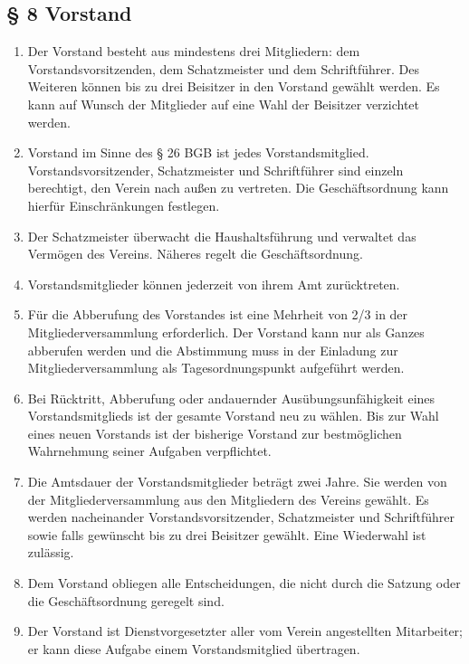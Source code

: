 ﻿\documentclass[10pt,a4paper]{scrartcl}
\begin{document}
%
%
\subsection*{§ 8 Vorstand }
\begin{enumerate}

    \item Der Vorstand besteht aus mindestens drei Mitgliedern: dem
    Vorstandsvorsitzenden, dem Schatzmeister und dem Schriftführer. Des
    Weiteren können bis zu drei Beisitzer in den Vorstand gewählt werden. Es
    kann auf Wunsch der Mitglieder auf eine Wahl der Beisitzer verzichtet
    werden.
    \item Vorstand im Sinne des § 26 BGB ist jedes Vorstandsmitglied.
    Vorstandsvorsitzender, Schatzmeister und Schriftführer sind einzeln
    berechtigt, den Verein nach außen zu vertreten. Die Geschäftsordnung kann
    hierfür Einschränkungen festlegen.
	\item Der Schatzmeister über\-wacht die Haushaltsführung und verwaltet das
		Ver\-mö\-gen des Vereins. Nä\-her\-es regelt die Ge\-schäfts\-ord\-nung.
	\item Vorstandsmitglieder können jederzeit von ihrem Amt zurücktreten.
        \item Für die Abberufung des Vorstandes ist eine Mehrheit von 2/3 in der Mitgliederversammlung erforderlich. Der Vorstand kann nur als Ganzes abberufen werden und die Abstimmung muss in der Einladung zur Mitgliederversammlung als Tagesordnungspunkt aufgeführt werden.
        \item Bei Rücktritt, Abberufung oder andauernder Ausübungsunfähigkeit eines Vorstandsmitglieds ist
		der gesamte Vorstand neu zu wählen. Bis zur Wahl eines neuen Vorstands ist der
		bisherige Vorstand zur bestmöglichen Wahrnehmung seiner Aufgaben verpflichtet.
    \item Die Amtsdauer der Vorstandsmitglieder beträgt zwei Jahre. Sie werden
    von der Mitgliederversammlung aus den Mitgliedern des Vereins gewählt. Es
    werden nacheinander Vorstandsvorsitzender, Schatzmeister und Schriftführer
    sowie falls gewünscht bis zu drei Beisitzer gewählt. Eine Wiederwahl ist
    zulässig.
    \item Dem Vorstand obliegen alle Entscheidungen, die nicht durch die Satzung oder die Geschäftsordnung geregelt sind.
	\item Der Vorstand ist Dienstvorgesetzter aller vom Verein angestellten Mitarbeiter;
		er kann diese Aufgabe einem Vorstandsmitglied übertragen.

\end{enumerate}
\end{document}
